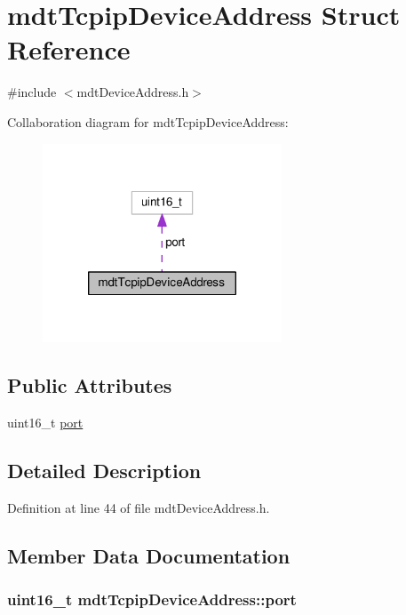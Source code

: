 \hypertarget{structmdt_tcpip_device_address}{\section{mdt\-Tcpip\-Device\-Address Struct Reference}
\label{structmdt_tcpip_device_address}
}


{\ttfamily \#include $<$mdt\-Device\-Address.\-h$>$}



Collaboration diagram for mdt\-Tcpip\-Device\-Address\-:
\nopagebreak
\begin{figure}[H]
\begin{center}
\leavevmode
\includegraphics[width=202pt]{structmdt_tcpip_device_address__coll__graph}
\end{center}
\end{figure}
\subsection*{Public Attributes}
\begin{DoxyCompactItemize}
\item 
uint16\-\_\-t \hyperlink{structmdt_tcpip_device_address_a0c35eb6aaab0aafcaa7175c19979f81d}{port}
\end{DoxyCompactItemize}


\subsection{Detailed Description}


Definition at line 44 of file mdt\-Device\-Address.\-h.



\subsection{Member Data Documentation}
\hypertarget{structmdt_tcpip_device_address_a0c35eb6aaab0aafcaa7175c19979f81d}{
\subsubsection[{port}]{\setlength{\rightskip}{0pt plus 5cm}uint16\-\_\-t mdt\-Tcpip\-Device\-Address\-::port}}\label{structmdt_tcpip_device_address_a0c35eb6aaab0aafcaa7175c19979f81d}


